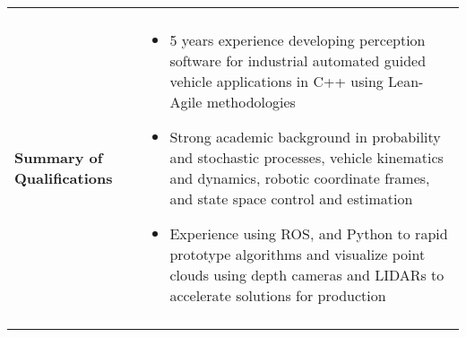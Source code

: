 \begin{tabular}{L{\lcolw}  L{\rcolw}}
 \hline \hline \\
\textbf{\Large Summary of Qualifications} &
\vspace{-0.3in} 
    \begin{itemize}[leftmargin = \itemmargin]

	\item 5 years experience developing perception software for industrial automated guided vehicle applications in C++ using Lean-Agile methodologies
	
	\item Strong academic background in probability and stochastic processes, vehicle kinematics and dynamics, robotic coordinate frames, and state space control and estimation

	\item Experience using ROS, and Python to rapid prototype algorithms and visualize point clouds using depth cameras and LIDARs to accelerate solutions for production
		
	\end{itemize}\\
 \hline \\ 
\end{tabular}